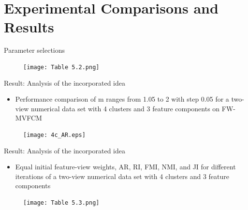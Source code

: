 \documentclass[compress,sky blue]{beamer}
\begin{document}

\section{Experimental Comparisons and Results }



\begin{frame}{Parameter selections }

\begin{figure}
\texttt{[image: Table 5.2.png]}
\end{figure}

\end{frame}


\begin{frame}{Result: Analysis of the incorporated idea }
\vspace{-0.35cm}	
\begin{itemize}
\item Performance comparison of m ranges from 1.05 to 2 with step 0.05 for a two-view numerical data set with 4 clusters and 3 feature components on FW-MVFCM
\end{itemize}

\begin{figure}
\texttt{[image: 4c\_AR.eps]}
\end{figure}
\end{frame}

\begin{frame}{Result: Analysis of the incorporated idea }
\vspace{-0.35cm}
\begin{itemize}
\item \scriptsize{Equal initial feature-view weights, AR, RI, FMI, NMI, and JI for different iterations of  a two-view numerical data set with 4 clusters and 3 feature components}
\end{itemize}
\begin{figure}
\texttt{[image: Table 5.3.png]}
\end{figure}
\end{frame}
\end{document}
